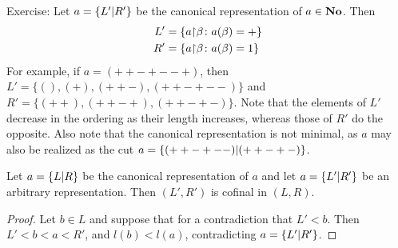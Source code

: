 Exercise: Let $a = \left\{ L' \vert R' \right\}$ be the canonical representation 
of $a \in \mathbf{No}$. Then 
\begin{align*}
	L' &= \left\{ a \mathord{\upharpoonright} \beta \colon a(\beta) = + \right\} \\
	R' &= \left\{ a \mathord{\upharpoonright} \beta \colon a(\beta) = 1 \right\}
\end{align*}
For example, if $a = (++-+--+)$, then $L' = \{(), (+), (++-), (++-+--)\}$
and $R' = \{(++), (++-+), (++-+-)\}$. Note that the elements of 
$L'$ decrease in the ordering as their length increases, whereas those 
of $R'$ do the opposite. Also note that the canonical representation 
is not minimal, as $a$ may also be realized as the cut 
$a = \left\{ (++-+--) \vert (++-+-) \right\}$. 
\begin{cor}
	Let $a = \left\{ L \vert R \right\}$ be the canonical representation 
	of $a$ and let $a = \left\{ L' \vert R' \right\}$ be an arbitrary 
	representation. Then $(L', R')$ is cofinal in $(L, R)$. 
	\label{inverse_cofinality_theorem}
\end{cor}
\begin{proof}
	Let $b \in L$ and suppose that for a contradiction that 
	$L' < b$. Then $L' < b < a < R'$, and $l(b) < l(a)$, 
	contradicting $a = \left\{ L' \vert R' \right\}$. 
\end{proof}
